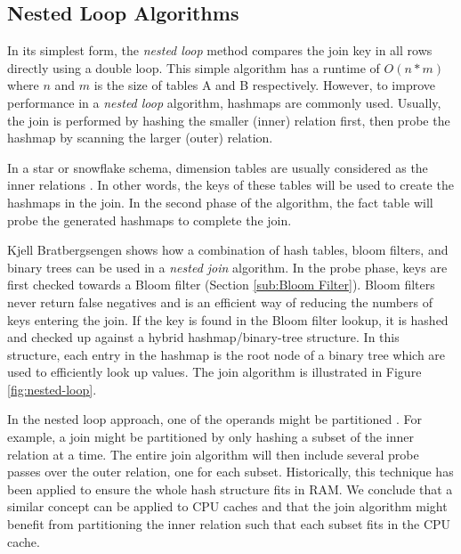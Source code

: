 \subsection{Nested Loop Algorithms}
\label{sub:Nested Loop Algorithms}

In its simplest form, the \textit{nested loop} method compares the join key in all rows directly using a double loop. This simple algorithm has a runtime of $O(n*m)$ where $n$ and $m$ is the size of tables A and B respectively. However, to improve performance in a \textit{nested loop} algorithm, hashmaps are commonly used. Usually, the join is performed by hashing the smaller (inner) relation first, then probe the hashmap by scanning the larger (outer) relation. 

In a star or snowflake schema, dimension tables are usually considered as the inner relations \cite{Barber2012-xt, Raman2013-em}. In other words, the keys of these tables will be used to create the hashmaps in the join. In the second phase of the algorithm, the fact table will probe the generated hashmaps to complete the join. 


Kjell Bratbergsengen shows how a combination of hash tables, bloom filters, and binary trees can be used in a \textit{nested join} algorithm. In the probe phase, keys are first checked towards a Bloom filter (Section \ref{sub:Bloom Filter}). Bloom filters never return false negatives and is an efficient way of reducing the numbers of keys entering the join. If the key is found in the Bloom filter lookup, it is hashed and checked up against a hybrid hashmap/binary-tree structure. In this structure, each entry in the hashmap is the root node of a binary tree which are used to efficiently look up values. The join algorithm is illustrated in Figure \ref{fig:nested-loop}.

In the nested loop approach, one of the operands might be partitioned \cite{Bratbergsengen2015-ed}. For example, a join might be partitioned by only hashing a subset of the inner relation at a time. The entire join algorithm will then include several probe passes over the outer relation, one for each subset. Historically, this technique has been applied to ensure the whole hash structure fits in RAM. We conclude that a similar concept can be applied to CPU caches and that the join algorithm might benefit from partitioning the inner relation such that each subset fits in the CPU cache.

